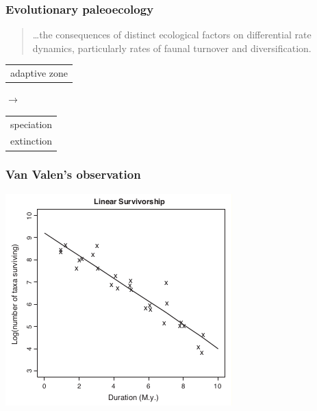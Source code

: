 \documentclass{beamer}
\begin{document}
\begin{frame}
  \frametitle{Evolutionary paleoecology}
  \begin{quotation}
    \dots the consequences of distinct ecological factors on differential rate dynamics, particularly rates of faunal turnover and diversification.

    \tiny{}
  \end{quotation}

  \vspace{1.3cm}

  \begin{center}
    \begin{tabular}{@{}l@{}}adaptive zone\end{tabular} 
    \hspace{0.5cm}
    \(\rightarrow\) 
    \hspace{1cm}
    \begin{tabular}{@{}l@{}}speciation\\extinction\end{tabular}
  \end{center}
\end{frame}


\begin{frame}
  \frametitle{Van Valen's observation}

  \begin{center}
    \includegraphics[height = 0.7\textheight, keepaspectratio = true]{figure/liow}

    \tiny{}
  \end{center}
\end{frame}
\end{document}
